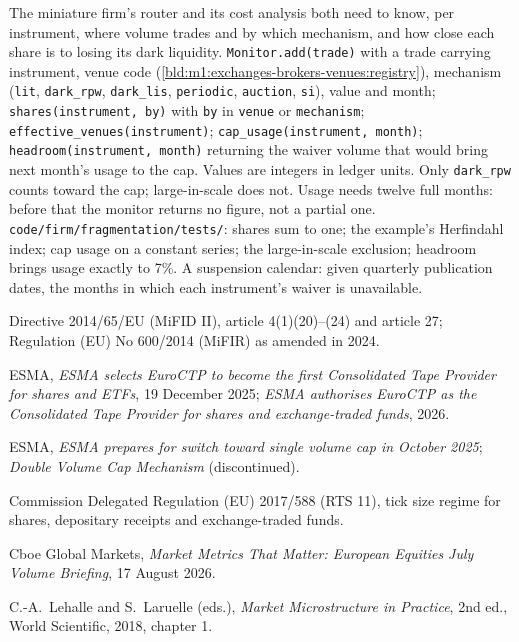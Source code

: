 \begin{build}
 The miniature firm's router and its cost analysis both need
to know, per instrument, where volume trades and by which mechanism, and how
close each share is to losing its dark liquidity.
 \texttt{Monitor.add(trade)} with a trade carrying
instrument, venue code (\cref{bld:m1:exchanges-brokers-venues:registry}),
mechanism (\texttt{lit}, \texttt{dark\_rpw}, \texttt{dark\_lis},
\texttt{periodic}, \texttt{auction}, \texttt{si}), value and month;
\texttt{shares(instrument, by)} with \texttt{by} in \texttt{venue} or
\texttt{mechanism}; \texttt{effective\_venues(instrument)};
\texttt{cap\_usage(instrument, month)}; \texttt{headroom(instrument, month)}
returning the waiver volume that would bring next month's usage to the cap.
 Values are integers in ledger units. Only \texttt{dark\_rpw}
counts toward the cap; large-in-scale does not. Usage needs twelve full
months: before that the monitor returns no figure, not a partial one.
 \texttt{code/firm/fragmentation/tests/}: shares sum
to one; the example's Herfindahl index; cap usage on a constant series; the
large-in-scale exclusion; headroom brings usage exactly to 7\%.
 A suspension calendar: given quarterly publication dates,
the months in which each instrument's waiver is unavailable.
\end{build}

\begin{omsources}
\item Directive 2014/65/EU (MiFID II), article 4(1)(20)--(24) and article 27;
Regulation (EU) No 600/2014 (MiFIR) as amended in 2024.
\item ESMA, \emph{ESMA selects EuroCTP to become the first Consolidated Tape
Provider for shares and ETFs}, 19 December 2025; \emph{ESMA authorises
EuroCTP as the Consolidated Tape Provider for shares and exchange-traded
funds}, 2026.
\item ESMA, \emph{ESMA prepares for switch toward single volume cap in October
2025}; \emph{Double Volume Cap Mechanism} (discontinued).
\item Commission Delegated Regulation (EU) 2017/588 (RTS 11), tick size
regime for shares, depositary receipts and exchange-traded funds.
\item Cboe Global Markets, \emph{Market Metrics That Matter: European Equities
July Volume Briefing}, 17 August 2026.
\item C.-A.~Lehalle and S.~Laruelle (eds.), \emph{Market Microstructure in
Practice}, 2nd ed., World Scientific, 2018, chapter 1.
\end{omsources}

